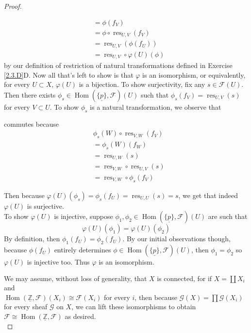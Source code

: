 \documentclass{article}
\newcommand{\Z}{\mathbb{Z}}
\newcommand{\fF}{\mathscr{F}}
\newcommand{\fG}{\mathscr{G}}
\DeclareMathOperator{\res}{res}
\DeclareMathOperator{\Hom}{Hom}
\begin{document}
\begin{proof}
\begin{enumerate}[(a)]
\begin{align*}
            &=\phi(f_V)\\
            &=\phi\circ \res_{U,V}(f_V)\\
            &=\res_{U,V}(\phi(f_U))\\
            &=\res_{U,V}\circ \varphi(U)(\phi)
        \end{align*}
        by our definition of restriction of natural transformations defined in Exercise \ref{2.3.D}D. Now all that's left to show is that $\varphi$ is an isomorphism, or equivalently, for every $U\subset X$, $\varphi(U)$ is a bijection. To show surjectivity, fix any $s\in \fF(U)$. Then there exists $\phi_s\in \Hom(\underline{\{p\}},\fF)(U)$ such that $\phi_s(f_V)=\res_{U,V}(s)$ for every $V\subset U$. To show $\phi_s$ is a natural transformation, we observe that
        \begin{center}
        \end{center}
        commutes because
        \begin{align*}
            &\phi_s(W)\circ \res_{V,W}(f_V)\\
            &=\phi_s(W)(f_W)\\
            &=\res_{U,W}(s)\\
            &=\res_{V,W}\circ \res_{U,V}(s)\\
            &=\res_{V,W}\circ \phi_s(f_V)
        \end{align*}
    \end{enumerate}
    Then because $\varphi(U)(\phi_s)=\phi_s(f_U)=\res_{U,U}(s)=s$, we get that indeed $\varphi(U)$ is surjective.\\
    To show $\varphi(U)$ is injective, suppose $\phi_1,\phi_2\in \Hom(\underline{\{p\}},\fF)(U)$ are such that
    \[
    \varphi(U)(\phi_1)=\varphi(U)(\phi_2)
    \]
    By definition, then $\phi_1(f_U)=\phi_2(f_U)$. By our initial observations though, because $\phi(f_U)$ entirely determines $\phi\in \Hom(\underline{\{p\}},\fF)(U)$, then $\phi_1=\phi_2$ so $\varphi(U)$ is injective too. Thus $\varphi$ is an isomorphism.
    \item We may assume, without loss of generality, that $X$ is connected, for if $X=\coprod X_i$ and \\$\Hom(\underline{\Z}, \fF)(X_i)\cong \fF (X_i)$ for every $i$, then because $\fG(X)=\prod \fG(X_i)$ for every sheaf $\fG$ on $X$, we can lift these isomorphisms to obtain $\fF\cong \Hom(\underline{\Z},\fF)$ as desired.\\

\end{proof}
\end{document}
